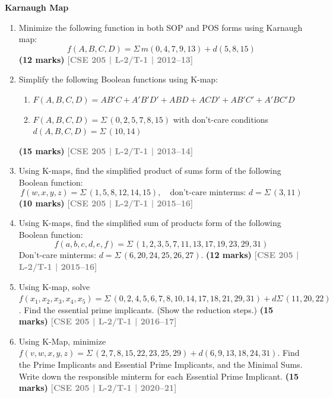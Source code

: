 \documentclass[12pt,a4paper]{article}
\newcommand{\yr}[1]{\hfill\textcolor{gray}{\small\textbf{[#1]}}}
\newcommand{\mk}[1]{\textcolor{orange!70!black}{\small\textbf{(#1 marks)}}}
\newcommand{\subtopic}[2]{%
  \vspace{10pt}
  \noindent\begin{tcolorbox}[colback=#1!8,colframe=#1,boxrule=0.6pt,arc=4pt,
    left=6pt,right=6pt,top=4pt,bottom=4pt]
    \small\bfseries\textcolor{#1}{#2}
  \end{tcolorbox}
  \vspace{2pt}
}
\begin{document}
\subtopic{cC}{Karnaugh Map}
\label{sub:s3-kmap}

\begin{enumerate}

\item Minimize the following function in both SOP and POS forms using Karnaugh map:
\[ f(A,B,C,D) = \Sigma\,m(0,4,7,9,13) + d(5,8,15) \]
\mk{12} \yr{CSE 205 | L-2/T-1 | 2012--13}

\item Simplify the following Boolean functions using K-map:
\begin{enumerate}
  \item $F(A,B,C,D) = AB'C + A'B'D' + ABD + ACD' + AB'C' + A'BC'D$
  \item $F(A,B,C,D) = \Sigma\,(0,2,5,7,8,15)$ with don't-care conditions $d(A,B,C,D) = \Sigma\,(10,14)$

  \end{enumerate}
\mk{15} \yr{CSE 205 | L-2/T-1 | 2013--14}
\item Using K-maps, find the simplified product of sums form of the following Boolean function:
\[ f(w, x, y, z) = \Sigma\,(1, 5, 8, 12, 14, 15), \quad \text{don't-care minterms: } d = \Sigma\,(3, 11) \]
\mk{10} \yr{CSE 205 | L-2/T-1 | 2015--16}


\item Using K-maps, find the simplified sum of products form of the following Boolean function:
\[ f(a,b,c,d,e,f) = \Sigma\,(1,2,3,5,7,11,13,17,19,23,29,31) \]
Don't-care minterms: $d = \Sigma\,(6,20,24,25,26,27)$.
\mk{12} \yr{CSE 205 | L-2/T-1 | 2015--16}


\item Using K-map, solve $f(x_1,x_2,x_3,x_4,x_5) = \Sigma\,(0,2,4,5,6,7,8,10,14,17,18,21,29,31) + d\Sigma\,(11,20,22)$. Find the essential prime implicants. (Show the reduction steps.)
\mk{15} \yr{CSE 205 | L-2/T-1 | 2016--17}

\item Using K-Map, minimize $f(v,w,x,y,z) = \Sigma\,(2,7,8,15,22,23,25,29) + d(6,9,13,18,24,31)$. Find the Prime Implicants and Essential Prime Implicants, and the Minimal Sums. Write down the responsible minterm for each Essential Prime Implicant.
\mk{15} \yr{CSE 205 | L-2/T-1 | 2020--21}



\end{enumerate}
\end{document}

